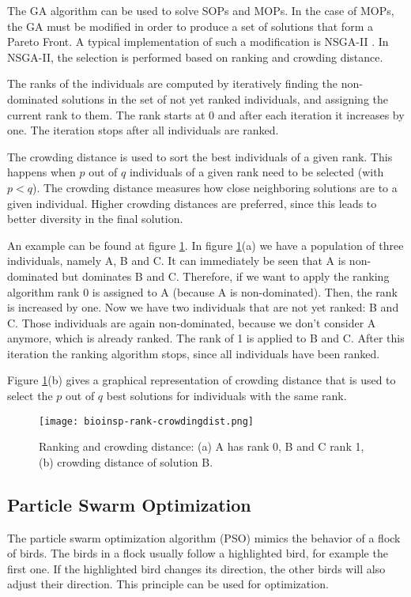The GA algorithm can be used to solve SOPs and MOPs. In the case of MOPs, the GA must be modified in order to produce a set of solutions that form a Pareto Front. A typical implementation of such a modification is NSGA-II \cite{deb2002fast}. In NSGA-II, the selection is performed based on ranking and crowding distance.

The ranks of the individuals are computed by iteratively finding the non-dominated solutions in the set of not yet ranked individuals, and assigning the current rank to them. The rank starts at 0 and after each iteration it increases by one. The iteration stops after all individuals are ranked.

The crowding distance is used to sort the best individuals of a given rank. This happens when $p$ out of $q$ individuals of a given rank need to be selected (with $p < q$). The crowding distance measures how close neighboring solutions are to a given individual. Higher crowding distances are preferred, since this leads to better diversity in the final solution.

An example can be found at figure \ref{fig:rank-crowdingdist}. In figure \ref{fig:rank-crowdingdist}(a) we have a population of three individuals, namely A, B and C. It can immediately be seen that A is non-dominated but dominates B and C. Therefore, if we want to apply the ranking algorithm rank 0 is assigned to A (because A is non-dominated). Then, the rank is increased by one. Now we have two individuals that are not yet ranked: B and C. Those individuals are again non-dominated, because we don't consider A anymore, which is already ranked. The rank of 1 is applied to B and C. After this iteration the ranking algorithm stops, since all individuals have been ranked.

Figure \ref{fig:rank-crowdingdist}(b) gives a graphical representation of crowding distance that is used to select the $p$ out of $q$ best solutions for individuals with the same rank.

\begin{figure}
  \centering
  \texttt{[image: bioinsp-rank-crowdingdist.png]}
  \caption[Ranking and crowding distance]{Ranking and crowding distance: (a) A has rank 0, B and C rank 1, (b) crowding distance of solution B.}
  \label{fig:rank-crowdingdist}
\end{figure}

\subsection{Particle Swarm Optimization}
The particle swarm optimization algorithm (PSO) mimics the behavior of a flock of birds. The birds in a flock usually follow a highlighted bird, for example the first one. If the highlighted bird changes its direction, the other birds will also adjust their direction. This principle can be used for optimization.

